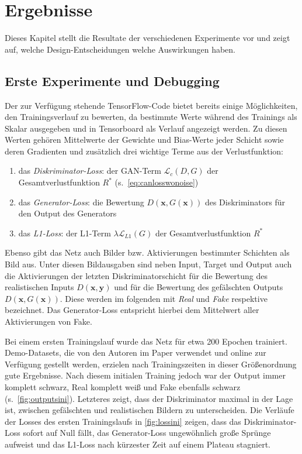 \chapter{Ergebnisse}

Dieses Kapitel stellt die Resultate der verschiedenen Experimente vor und zeigt auf, welche Design-Entscheidungen welche Auswirkungen haben.



\section{Erste Experimente und Debugging}

Der zur Verfügung stehende TensorFlow-Code bietet bereits einige Möglichkeiten, den Trainingsverlauf zu bewerten, da bestimmte Werte während des Trainings als Skalar ausgegeben und in Tensorboard als Verlauf angezeigt werden.
Zu diesen Werten gehören Mittelwerte der Gewichte und Bias-Werte jeder Schicht sowie deren Gradienten und zusätzlich drei wichtige Terme aus der Verlustfunktion:

\begin{enumerate}
	\item das \emph{Diskriminator-Loss}: der GAN-Term $ \mathcal{L}_c(D, G) $ der Gesamtverlustfunktion $ R^* $ (s.~\autoref{eq:canlosswonoise})
	\item das \emph{Generator-Loss}: die Bewertung $ D(\mathbf{x}, G(\mathbf{x})) $ des Diskriminators für den Output des Generators
	\item das \emph{L1-Loss}: der L1-Term $ \lambda \mathcal{L}_{L1}(G) $ der Gesamtverlustfunktion $ R^* $
\end{enumerate}

Ebenso gibt das Netz auch Bilder bzw. Aktivierungen bestimmter Schichten als Bild aus.
Unter diesen Bildausgaben sind neben Input, Target und Output auch die Aktivierungen der letzten Diskriminatorschicht für die Bewertung des realistischen Inputs $ D(\mathbf{x}, \mathbf{y}) $ und für die Bewertung des gefälschten Outputs $ D(\mathbf{x}, G(\mathbf{x})) $.
Diese werden im folgenden mit \emph{Real} und \emph{Fake} respektive bezeichnet.
Das Generator-Loss entspricht hierbei dem Mittelwert aller Aktivierungen von Fake.

Bei einem ersten Trainingslauf wurde das Netz für etwa 200 Epochen trainiert.
Demo-Datasets, die von den Autoren im Paper verwendet und online zur Verfügung gestellt werden, erzielen nach Trainingszeiten in dieser Größenordnung gute Ergebnisse.
Nach diesem initialen Training jedoch war der Output immer komplett schwarz, Real komplett weiß und Fake ebenfalls schwarz (s.~\autoref{fig:outputsini}).
Letzteres zeigt, dass der Diskriminator maximal in der Lage ist, zwischen gefälschten und realistischen Bildern zu unterscheiden.
Die Verläufe der Losses des ersten Trainingslaufs in \autoref{fig:lossini} zeigen, dass das Diskriminator-Loss sofort auf Null fällt, das Generator-Loss ungewöhnlich große Sprünge aufweist und das L1-Loss nach kürzester Zeit auf einem Plateau stagniert.

